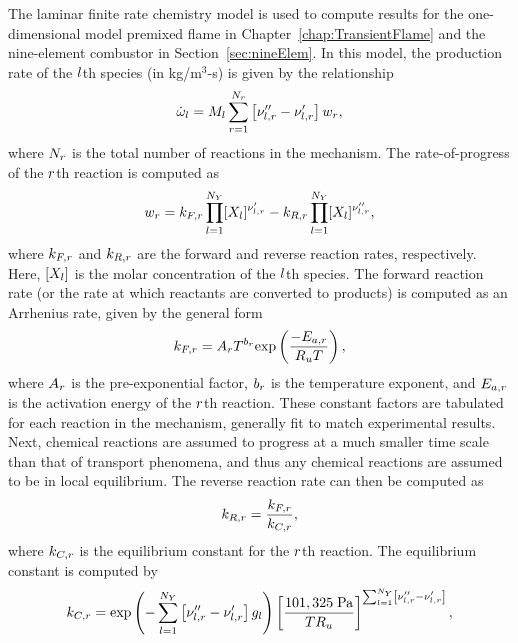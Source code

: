 The laminar finite rate chemistry model is used to compute results for the one-dimensional model premixed flame in Chapter~\ref{chap:TransientFlame} and the nine-element combustor in Section~\ref{sec:nineElem}. In this model, the production rate of the $l$th species (in kg/m$^3$-s) is given by the relationship
%
\begin{equation}\label{eq:specProd}
	\dot{\omega}_{l} = M_{l} \sum_{r = 1}^{N_r} \left[\nu_{l,r}'' - \nu_{l,r}'\right] w_{r},
\end{equation}
%
where $N_r$ is the total number of reactions in the mechanism. The rate-of-progress of the $r$th reaction is computed as
%
\begin{equation}\label{eq:rateOfProg}
	w_{r} = k_{F,r} \prod_{l=1}^{N_Y} [X_{l}]^{\nu_{l,r}'} - k_{R,r} \prod_{l=1}^{N_Y} [X_{l}]^{\nu_{l,r}''},
\end{equation}
%
where $k_{F,r}$ and $k_{R,r}$ are the forward and reverse reaction rates, respectively. Here, $[X_{l}]$ is the molar concentration of the $l$th species. The forward reaction rate (or the rate at which reactants are converted to products) is computed as an Arrhenius rate, given by the general form
%
\begin{equation}
	k_{F,r} = A_{r} T^{b_{r}} \text{exp} \left( \frac{-E_{a,r}}{R_u T} \right),
\end{equation}
%
where $A_{r}$ is the pre-exponential factor, $b_{r}$ is the temperature exponent, and $E_{a,r}$ is the activation energy of the $r$th reaction. These constant factors are tabulated for each reaction in the mechanism, generally fit to match experimental results. Next, chemical reactions are assumed to progress at a much smaller time scale than that of transport phenomena, and thus any chemical reactions are assumed to be in local equilibrium. The reverse reaction rate can then be computed as
%
\begin{equation}
	k_{R,r} = \frac{k_{F,r}}{k_{C,r}},
\end{equation}
%
where $k_{C,r}$ is the equilibrium constant for the $r$th reaction. The equilibrium constant is computed by
%
\begin{equation}
	k_{C,r} = \text{exp}\left(-\sum_{l = 1}^{N_Y} \left[\nu_{l,r}'' - \nu_{l,r}'\right] g_{l}\right) \left[\frac{101,325 \; \text{Pa}}{T R_u}\right]^{\sum_{l = 1}^{N_Y} \left[\nu_{l,r}'' - \nu_{l,r}'\right]},
\end{equation}
